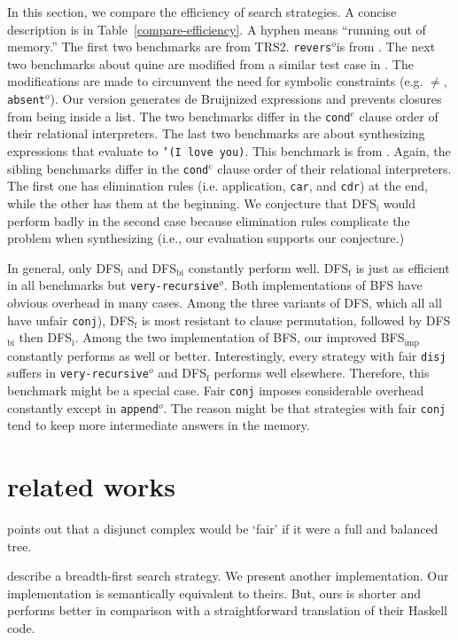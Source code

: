 \documentclass[format=acmlarge, review=true, authordraft=true]{acmart}
\newcommand{\conde}{\texttt{cond$^e$}}
\newcommand{\conj}{\texttt{conj}}
\newcommand{\disj}{\texttt{disj}}
\newcommand{\veryrecursiveo}{\texttt{very-recursive$^o$}}
\newcommand{\appendo}{\texttt{append$^o$}}
\newcommand{\reverso}{\texttt{revers$^o$}}
\newcommand{\DFSi }[0]{DFS$_\textrm{i}$}
\newcommand{\DFSf }[0]{DFS$_\textrm{f}$}
\newcommand{\DFSbi}[0]{DFS$_\textrm{bi}$}
\newcommand{\BFSimp}[0]{BFS$_\textrm{imp}$}
\begin{document}
In this section, we compare the efficiency of search strategies. A concise 
description is in Table~\ref{compare-efficiency}. A hyphen means ``running out
of memory.'' The first two benchmarks are from 
TRS2. \reverso is from 
\citet{rozplokhas2018improving}. The next two benchmarks 
about quine are modified from a similar test case in \citet{byrd2017unified}. 
The modifications are made 
to circumvent the need for symbolic constraints (e.g. $\neq$, 
\texttt{absent$^o$}). Our version generates de 
Bruijnized expressions and prevents closures from being inside a list. The two 
benchmarks differ in the \conde{} clause order of their relational 
interpreters. 
The last two 
benchmarks are about synthesizing expressions that evaluate to \texttt{'(I love 
you)}. This benchmark is from \citet{byrd2017unified}. Again, the 
sibling benchmarks differ in the \conde{} clause order of their relational 
interpreters. The first one 
has elimination rules (i.e. application, \texttt{car}, and \texttt{cdr}) at the 
end, while the other has them at the beginning. We conjecture that \DFSi{} 
would 
perform badly in the second case because elimination rules complicate the 
problem when synthesizing (i.e., our evaluation supports our conjecture.)

In general, only \DFSi{} and \DFSbi{} constantly perform well. \DFSf{} is just 
as efficient in all benchmarks but \veryrecursiveo. Both implementations of BFS 
have obvious overhead in many cases. Among the three variants of DFS, which all 
all have unfair \conj{}), \DFSf{} is most resistant to clause permutation, 
followed by \DFSbi{} then \DFSi{}. Among the two implementation of BFS, our 
improved \BFSimp{} constantly performs as well or better. Interestingly, every 
strategy with fair \disj{} suffers in \veryrecursiveo{} and \DFSf{} performs 
well elsewhere. Therefore, this benchmark might be a special case. Fair \conj{} 
imposes considerable overhead constantly except in \appendo. The reason might be 
that strategies with fair \conj{} tend to keep more intermediate answers in the 
memory.

\section{related works}

\citet{yang2010adventures} points out that a disjunct complex would be `fair' 
if it were a full and balanced tree.

\citet{seres1999algebra} describe a breadth-first search 
strategy. We present another implementation. Our implementation is semantically 
equivalent to theirs. But, ours is shorter and performs better in comparison 
with a straightforward translation of their Haskell code.
\end{document}
